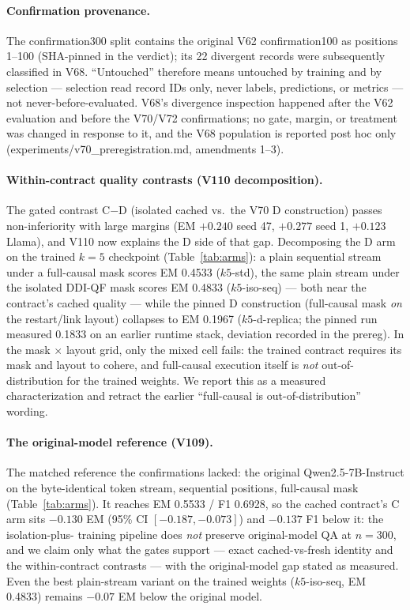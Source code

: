 \paragraph{Confirmation provenance.}
The confirmation300 split contains the original V62 confirmation100 as
positions 1--100 (SHA-pinned in the verdict); its 22 divergent records were
subsequently classified in V68. ``Untouched'' therefore means untouched by
training and by selection --- selection read record IDs only, never labels,
predictions, or metrics --- not never-before-evaluated. V68's divergence
inspection happened after the V62 evaluation and before the V70/V72
confirmations; no gate, margin, or treatment was changed in response to it,
and the V68 population is reported post hoc only
(experiments/v70\_preregistration.md, amendments 1--3).
\paragraph{Within-contract quality contrasts (V110 decomposition).}
The gated contrast C$-$D (isolated cached vs.\ the V70 D construction) passes
non-inferiority with large margins (EM $+0.240$ seed 47, $+0.277$ seed 1,
$+0.123$ Llama), and V110 now explains the D side of that gap. Decomposing
the D arm on the trained $k{=}5$ checkpoint (Table~\ref{tab:arms}): a plain
sequential stream under a full-causal mask scores EM 0.4533
($k5$-std), the same plain stream under the isolated DDI-QF mask scores EM
0.4833 ($k5$-iso-seq) --- both near the contract's cached quality --- while
the pinned D construction (full-causal mask \emph{on} the restart/link
layout) collapses to EM 0.1967 ($k5$-d-replica; the pinned run measured
0.1833 on an earlier runtime stack, deviation recorded in the prereg). In
the mask $\times$ layout grid, only the mixed cell fails: the trained
contract requires its mask and layout to cohere, and full-causal execution
itself is \emph{not} out-of-distribution for the trained weights. We report
this as a measured characterization and retract the earlier
``full-causal is out-of-distribution'' wording.

\paragraph{The original-model reference (V109).}
The matched reference the confirmations lacked: the original
Qwen2.5-7B-Instruct on the byte-identical token stream, sequential
positions, full-causal mask (Table~\ref{tab:arms}). It reaches EM 0.5533 /
F1 0.6928, so the cached contract's C arm sits $-0.130$ EM
(95\% CI $[-0.187, -0.073]$) and $-0.137$ F1 below it: the isolation-plus-
training pipeline does \emph{not} preserve original-model QA at $n{=}300$,
and we claim only what the gates support --- exact cached-vs-fresh
identity and the within-contract contrasts --- with the original-model gap
stated as measured. Even the best plain-stream variant on the trained
weights ($k5$-iso-seq, EM 0.4833) remains $-0.07$ EM below the original
model.


